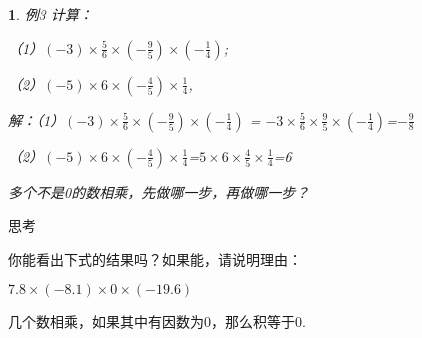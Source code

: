 \documentclass{article}
\newtheorem{example}{ }
\begin{document}
\begin{article}
\begin{example}
例3 计算：

（1）$(-3)\times\frac{5}{6}\times(-\frac{9}{5})\times(-\frac{1}{4})$;

（2）$(-5)\times6\times(-\frac{4}{5})\times\frac{1}{4}$,

解：（1）$(-3)\times\frac{5}{6}\times(-\frac{9}{5})\times(-\frac{1}{4})$ = 
$-3\times\frac{5}{6}\times\frac{9}{5}\times(-\frac{1}{4})$=$-\frac{9}{8}$

（2）$(-5)\times6\times(-\frac{4}{5})\times\frac{1}{4}$=$5\times6\times\frac{4}{5}\times\frac{1}{4}$=6

多个不是0的数相乘，先做哪一步，再做哪一步？

\end{example}

思考

你能看出下式的结果吗？如果能，请说明理由：

$7.8\times(-8.1)\times0\times(-19.6)$

几个数相乘，如果其中有因数为0，那么积等于0.

\end{article}
\end{document}
